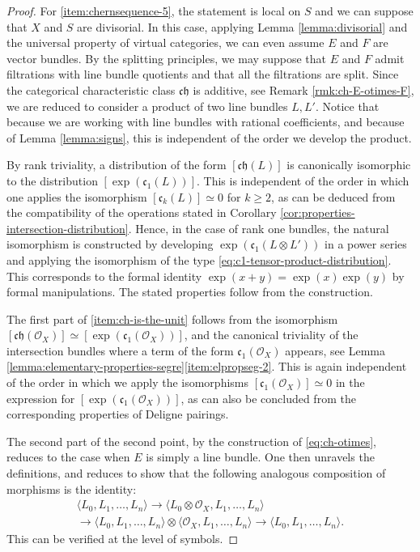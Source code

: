 \documentclass[11pt]{article}
\theoremstyle{plain}
\theoremstyle{definition}
\newcommand{\Ocal}{\mathcal O}
\newcommand{\cfrak}{\mathfrak c}
\newcommand{\chfrak}{\mathfrak {ch}}
\begin{document}
\begin{proof}
For \eqref{item:chernsequence-5}, the statement is local on $S$ and we can suppose that $X$ and $S$ are divisorial. In this case, applying Lemma \ref{lemma:divisorial} and the universal property of virtual categories, we can even assume $E$ and $F$ are vector bundles. By the splitting principles, we may suppose that $E$ and $F$ admit filtrations with line bundle quotients and that all the filtrations are split. Since the categorical characteristic class $\chfrak$ is additive, see Remark \ref{rmk:ch-E-otimes-F}, we are reduced to consider a product of two line bundles $L,L'$. Notice that because we are working with line bundles with rational coefficients, and because of Lemma \ref{lemma:signs}, this is independent of the order we develop the product.

By rank triviality, a distribution of the form $[\chfrak(L)]$ is canonically isomorphic to the distribution $[\exp(\cfrak_1(L))]$. This is independent of the order in which one applies the isomorphism $[\cfrak_k(L)]\simeq 0$ for $k \geq 2$, as can be deduced from the compatibility of the operations stated in Corollary \ref{cor:properties-intersection-distribution}. Hence, in the case of rank one bundles, the natural isomorphism is constructed by developing $\exp(\cfrak_1(L \otimes L'))$ in a power series and applying the isomorphism of the type \eqref{eq:c1-tensor-product-distribution}. This corresponds to the formal identity $\exp(x+y) = \exp(x) \exp(y)$ by formal manipulations. The stated properties follow from the construction.

The first part of \eqref{item:ch-is-the-unit} follows from the isomorphism $[\chfrak(\Ocal_X)]\simeq [\exp(\cfrak_{1}(\Ocal_{X}))]$, and the canonical triviality of the intersection bundles where a term of the form $\cfrak_1(\Ocal_X)$ appears, see Lemma \ref{lemma:elementary-properties-segre}\eqref{item:elpropseg-2}. This is again independent of the order in which we apply the isomorphisms $[\cfrak_1(\Ocal_X)]\simeq 0$ in the expression for $[\exp(\cfrak_{1}(\Ocal_{X}))]$, as can also be concluded from the corresponding properties of Deligne pairings.

The second part of the second point, by the construction of \eqref{eq:ch-otimes}, reduces to the case when $E$ is simply a line bundle. One then unravels the definitions, and reduces to show that the following analogous composition of morphisms is the identity:
\begin{multline*}
\langle L_{0}, L_1, \ldots, L_n \rangle \to \langle L_{0} \otimes \Ocal_X, L_1, \ldots, L_n \rangle\\
\to \langle L_{0}, L_1, \ldots, L_n \rangle \otimes \langle \Ocal_X, L_1, \ldots, L_n \rangle \to \langle L_{0}, L_1, \ldots, L_n\rangle.
\end{multline*}
This can be verified at the level of symbols.
\end{proof}
\end{document}
